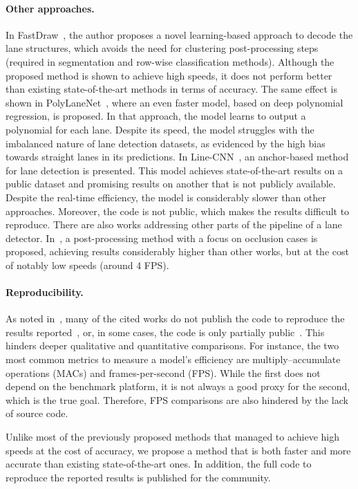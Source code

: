\documentclass[final]{cvpr}
\begin{document}
\paragraph{Other approaches.}
In FastDraw~\cite{fastdraw}, the author proposes a novel learning-based approach to decode the lane structures, which avoids the need for clustering post-processing steps (required in segmentation and row-wise classification methods). Although the proposed method is shown to achieve high speeds, it does not perform better than existing state-of-the-art methods in terms of accuracy. The same effect is shown in PolyLaneNet~\cite{polylanenet}, where an even faster model, based on deep polynomial regression, is proposed. In that approach, the model learns to output a polynomial for each lane. Despite its speed, the model struggles with the imbalanced nature of lane detection datasets, as evidenced by the high bias towards straight lanes in its predictions. In Line-CNN~\cite{linecnn}, an anchor-based method for lane detection is presented. This model achieves state-of-the-art results on a public dataset and promising results on another that is not publicly available. Despite the real-time efficiency, the model is considerably slower than other approaches. Moreover, the code is not public, which makes the results difficult to reproduce. There are also works addressing other parts of the pipeline of a lane detector. In~\cite{rgconstraints}, a post-processing method with a focus on occlusion cases is proposed, achieving results considerably higher than other works, but at the cost of notably low speeds (around 4 FPS). 

\paragraph{Reproducibility.}
As noted in~\cite{polylanenet}, many of the cited works do not publish the code to reproduce the results reported~\cite{linecnn,fastdraw,e2e-lmd}, or, in some cases, the code is only partially public~\cite{enet-sad,intrakd}. This hinders deeper qualitative and quantitative comparisons. For instance, the two most common metrics to measure a model's efficiency are multiply–accumulate operations (MACs) and frames-per-second (FPS). While the first does not depend on the benchmark platform, it is not always a good proxy for the second, which is the true goal. Therefore, FPS comparisons are also hindered by the lack of source code.

Unlike most of the previously proposed methods that managed to achieve high speeds at the cost of accuracy, we propose a method that is both faster and more accurate than existing state-of-the-art ones. In addition, the full code to reproduce the reported results is published for the community.
\end{document}
